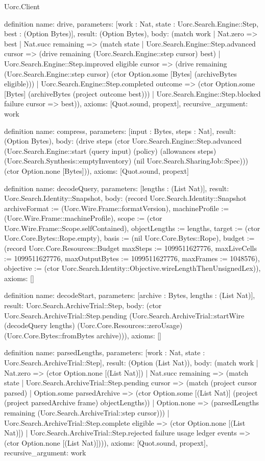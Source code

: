 \begin{lexlean}{Uorc.Client}
\begin{semanticmodule}
definition{
  name: drive,
  parameters: [work : Nat, state : Uorc.Search.Engine::Step, best : (Option Bytes)],
  result: (Option Bytes),
  body: (match work
    | Nat.zero => best
    | Nat.succ remaining => (match state
      | Uorc.Search.Engine::Step.advanced cursor => (drive remaining (Uorc.Search.Engine::step cursor) best)
      | Uorc.Search.Engine::Step.improved eligible cursor => (drive remaining (Uorc.Search.Engine::step cursor) (ctor Option.some [Bytes] (archiveBytes eligible)))
      | Uorc.Search.Engine::Step.completed outcome => (ctor Option.some [Bytes] (archiveBytes (project outcome best)))
      | Uorc.Search.Engine::Step.blocked failure cursor => best)),
  axioms: [Quot.sound, propext],
  recursive_argument: work
}

definition{
  name: compress,
  parameters: [input : Bytes, steps : Nat],
  result: (Option Bytes),
  body: (drive steps (ctor Uorc.Search.Engine::Step.advanced (Uorc.Search.Engine::start (query input) (policy) (allowances steps) (Uorc.Search.Synthesis::emptyInventory) (nil Uorc.Search.SharingJob::Spec))) (ctor Option.none [Bytes])),
  axioms: [Quot.sound, propext]
}

definition{
  name: decodeQuery,
  parameters: [lengths : (List Nat)],
  result: Uorc.Search.Identity::Snapshot,
  body: (record Uorc.Search.Identity::Snapshot {archiveFormat := (Uorc.Wire.Frame::formatVersion), machineProfile := (Uorc.Wire.Frame::machineProfile), scope := (ctor Uorc.Wire.Frame::Scope.selfContained), objectLengths := lengths, target := (ctor Uorc.Core.Bytes::Rope.empty), basis := (nil Uorc.Core.Bytes::Rope), budget := (record Uorc.Core.Resources::Budget {maxSteps := 1099511627776, maxLiveCells := 1099511627776, maxOutputBytes := 1099511627776, maxFrames := 1048576}), objective := (ctor Uorc.Search.Identity::Objective.wireLengthThenUnsignedLex)}),
  axioms: []
}

definition{
  name: decodeStart,
  parameters: [archive : Bytes, lengths : (List Nat)],
  result: Uorc.Search.ArchiveTrial::Step,
  body: (ctor Uorc.Search.ArchiveTrial::Step.pending (Uorc.Search.ArchiveTrial::startWire (decodeQuery lengths) (Uorc.Core.Resources::zeroUsage) (Uorc.Core.Bytes::fromBytes archive))),
  axioms: []
}

definition{
  name: parsedLengths,
  parameters: [work : Nat, state : Uorc.Search.ArchiveTrial::Step],
  result: (Option (List Nat)),
  body: (match work
    | Nat.zero => (ctor Option.none [(List Nat)])
    | Nat.succ remaining => (match state
      | Uorc.Search.ArchiveTrial::Step.pending cursor => (match (project cursor parsed)
        | Option.some parsedArchive => (ctor Option.some [(List Nat)] (project (project parsedArchive frame) objectLengths))
        | Option.none => (parsedLengths remaining (Uorc.Search.ArchiveTrial::step cursor)))
      | Uorc.Search.ArchiveTrial::Step.complete eligible => (ctor Option.none [(List Nat)])
      | Uorc.Search.ArchiveTrial::Step.rejected failure usage ledger events => (ctor Option.none [(List Nat)]))),
  axioms: [Quot.sound, propext],
  recursive_argument: work
}


\end{semanticmodule}
\end{lexlean}
